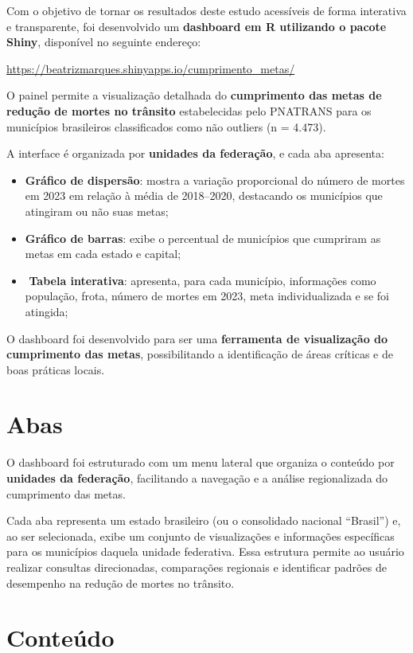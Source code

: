 \documentclass[
  letterpaper,
  DIV=11,
  numbers=noendperiod]{scrreprt}
\begin{document}
Com o objetivo de tornar os resultados deste estudo acessíveis de forma
interativa e transparente, foi desenvolvido um \textbf{dashboard em R
utilizando o pacote Shiny}, disponível no seguinte endereço:

\url{https://beatrizmarques.shinyapps.io/cumprimento_metas/}

O painel permite a visualização detalhada do \textbf{cumprimento das
metas de redução de mortes no trânsito} estabelecidas pelo PNATRANS para
os municípios brasileiros classificados como não outliers (n = 4.473).

A interface é organizada por \textbf{unidades da federação}, e cada aba
apresenta:

\begin{itemize}
\item
  \textbf{Gráfico de dispersão}: mostra a variação proporcional do
  número de mortes em 2023 em relação à média de 2018--2020, destacando
  os municípios que atingiram ou não suas metas;
\item
  \textbf{Gráfico de barras}: exibe o percentual de municípios que
  cumpriram as metas em cada estado e capital;
\item
  ️ \textbf{Tabela interativa}: apresenta, para cada município,
  informações como população, frota, número de mortes em 2023, meta
  individualizada e se foi atingida;
\end{itemize}

O dashboard foi desenvolvido para ser uma \textbf{ferramenta de
visualização do cumprimento das metas}, possibilitando a identificação
de áreas críticas e de boas práticas locais.

\section{Abas}\label{abas}

O dashboard foi estruturado com um menu lateral que organiza o conteúdo
por \textbf{unidades da federação}, facilitando a navegação e a análise
regionalizada do cumprimento das metas.

Cada aba representa um estado brasileiro (ou o consolidado nacional
``Brasil'') e, ao ser selecionada, exibe um conjunto de visualizações e
informações específicas para os municípios daquela unidade federativa.
Essa estrutura permite ao usuário realizar consultas direcionadas,
comparações regionais e identificar padrões de desempenho na redução de
mortes no trânsito.

\section{Conteúdo}\label{conteuxfado}
\end{document}
